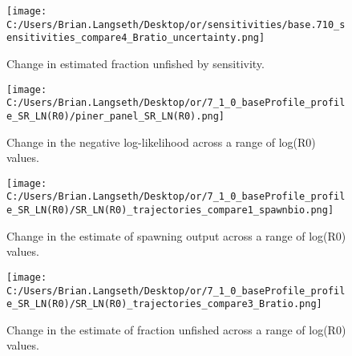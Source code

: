 \documentclass[11pt,
  english,
  a4paper,
]{article}
\begin{document}
\tagmcend\tagstructend


\begin{figure}
\centering
\texttt{[image: C:/Users/Brian.Langseth/Desktop/or/sensitivities/base.710\_sensitivities\_compare4\_Bratio\_uncertainty.png]}
\caption{Change in estimated fraction unfished by sensitivity.\label{fig:sens-depl}}
\end{figure}

\tagmcend\tagstructend


\begin{figure}
\centering
\texttt{[image: C:/Users/Brian.Langseth/Desktop/or/7\_1\_0\_baseProfile\_profile\_SR\_LN(R0)/piner\_panel\_SR\_LN(R0).png]}
\caption{Change in the negative log-likelihood across a range of log(R0) values.\label{fig:r0-profile}}
\end{figure}

\tagmcend\tagstructend


\begin{figure}
\centering
\texttt{[image: C:/Users/Brian.Langseth/Desktop/or/7\_1\_0\_baseProfile\_profile\_SR\_LN(R0)/SR\_LN(R0)\_trajectories\_compare1\_spawnbio.png]}
\caption{Change in the estimate of spawning output across a range of log(R0) values.\label{fig:r0-ssb}}
\end{figure}

\tagmcend\tagstructend


\begin{figure}
\centering
\texttt{[image: C:/Users/Brian.Langseth/Desktop/or/7\_1\_0\_baseProfile\_profile\_SR\_LN(R0)/SR\_LN(R0)\_trajectories\_compare3\_Bratio.png]}
\caption{Change in the estimate of fraction unfished across a range of log(R0) values.\label{fig:r0-depl}}
\end{figure}
\end{document}

